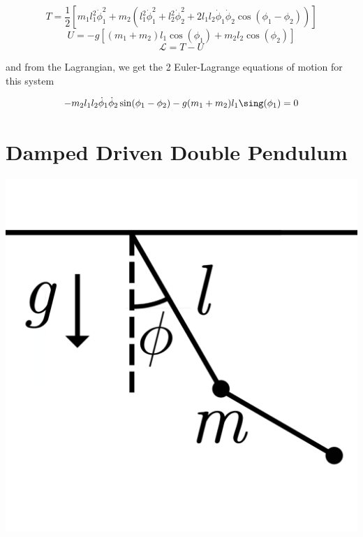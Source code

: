 \documentclass[a4paper, 11pt]{article}
\begin{document}
$$T=\frac{1}{2}[m_1 l_1^2 \dot{\phi}_1^2 + m_2(l_1^2 \dot{\phi}_1^2 + l_2^2 \dot{\phi}_2^2 + 2l_1 l_2 \dot{\phi}_1 \dot{\phi}_2\cos(\phi_1 - \phi_2))]$$
$$U=-g[(m_1+m_2)l_1\cos(\phi_1)+m_2l_2\cos(\phi_2)]$$
$$\mathcal{L}=T-U$$

and from the Lagrangian, we get the 2 Euler-Lagrange equations of motion for this system

$$-m_2l_1 l_2 \dot{\phi}_1 \dot{\phi}_2 \sin(\phi_1 - \phi_2) - g(m_1 + m_2)l_1\sing(\phi_1)=0$$

\section{Damped Driven Double Pendulum}
\begin{center}
    \centering
    \includegraphics[width=0.25\linewidth]{doublependulum.png}
    \label{fig:enter-label}
\end{center}
\end{document}

